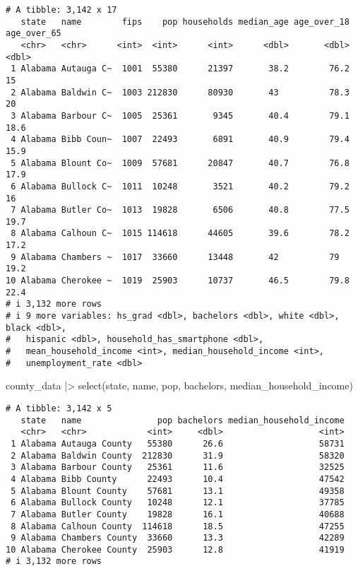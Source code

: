 \documentclass[
  letterpaper,
  DIV=11,
  numbers=noendperiod]{scrreprt}
\newenvironment{Shaded}{\begin{snugshade}}{\end{snugshade}}
\newcommand{\FunctionTok}[1]{\textcolor[rgb]{0.28,0.35,0.67}{#1}}
\newcommand{\NormalTok}[1]{\textcolor[rgb]{0.00,0.23,0.31}{#1}}
\newcommand{\SpecialCharTok}[1]{\textcolor[rgb]{0.37,0.37,0.37}{#1}}
\begin{document}
\begin{verbatim}
# A tibble: 3,142 x 17
   state   name        fips    pop households median_age age_over_18 age_over_65
   <chr>   <chr>      <int>  <int>      <int>      <dbl>       <dbl>       <dbl>
 1 Alabama Autauga C~  1001  55380      21397       38.2        76.2        15  
 2 Alabama Baldwin C~  1003 212830      80930       43          78.3        20  
 3 Alabama Barbour C~  1005  25361       9345       40.4        79.1        18.6
 4 Alabama Bibb Coun~  1007  22493       6891       40.9        79.4        15.9
 5 Alabama Blount Co~  1009  57681      20847       40.7        76.8        17.9
 6 Alabama Bullock C~  1011  10248       3521       40.2        79.2        16  
 7 Alabama Butler Co~  1013  19828       6506       40.8        77.5        19.7
 8 Alabama Calhoun C~  1015 114618      44605       39.6        78.2        17.2
 9 Alabama Chambers ~  1017  33660      13448       42          79          19.2
10 Alabama Cherokee ~  1019  25903      10737       46.5        79.8        22.4
# i 3,132 more rows
# i 9 more variables: hs_grad <dbl>, bachelors <dbl>, white <dbl>, black <dbl>,
#   hispanic <dbl>, household_has_smartphone <dbl>,
#   mean_household_income <int>, median_household_income <int>,
#   unemployment_rate <dbl>
\end{verbatim}

\begin{Shaded}
\begin{Highlighting}[]
\NormalTok{county\_data }\SpecialCharTok{|\textgreater{}} \FunctionTok{select}\NormalTok{(state, name, pop, bachelors, median\_household\_income)}
\end{Highlighting}
\end{Shaded}

\begin{verbatim}
# A tibble: 3,142 x 5
   state   name               pop bachelors median_household_income
   <chr>   <chr>            <int>     <dbl>                   <int>
 1 Alabama Autauga County   55380      26.6                   58731
 2 Alabama Baldwin County  212830      31.9                   58320
 3 Alabama Barbour County   25361      11.6                   32525
 4 Alabama Bibb County      22493      10.4                   47542
 5 Alabama Blount County    57681      13.1                   49358
 6 Alabama Bullock County   10248      12.1                   37785
 7 Alabama Butler County    19828      16.1                   40688
 8 Alabama Calhoun County  114618      18.5                   47255
 9 Alabama Chambers County  33660      13.3                   42289
10 Alabama Cherokee County  25903      12.8                   41919
# i 3,132 more rows
\end{verbatim}
\end{document}
